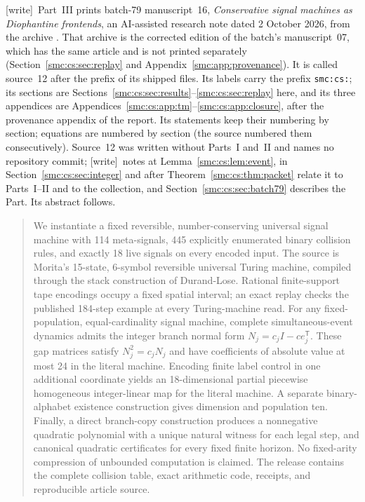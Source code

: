 \documentclass[11pt,letterpaper]{article}
\numberwithin{equation}{section}
\theoremstyle{definition}
\theoremstyle{remark}
\newcommand{\wtag}{\textup{[write]}}
\begin{document}
\noindent\wtag\ Part~III prints batch-79 manuscript~16, \emph{Conservative signal machines as Diophantine frontends}, an AI-assisted research note dated 2 October 2026, from the archive . That archive is the corrected edition of the batch's manuscript~07, which has the same article and is not printed separately (Section~\ref{smc:cs:sec:replay} and Appendix~\ref{smc:app:provenance}). It is called source~12 after the prefix of its shipped files. Its labels carry the prefix \texttt{smc:cs:}; its sections are Sections~\ref{smc:cs:sec:results}--\ref{smc:cs:sec:replay} here, and its three appendices are Appendices~\ref{smc:cs:app:tm}--\ref{smc:cs:app:closure}, after the provenance appendix of the report. Its statements keep their numbering by section; equations are numbered by section (the source numbered them consecutively). Source~12 was written without Parts~I and~II and names no repository commit; \wtag\ notes at Lemma~\ref{smc:cs:lem:event}, in Section~\ref{smc:cs:sec:integer} and after Theorem~\ref{smc:cs:thm:packet} relate it to Parts~I--II and to the collection, and Section~\ref{smc:cs:sec:batch79} describes the Part. Its abstract follows.
\begin{quote}\small
We instantiate a fixed reversible, number-conserving universal signal machine with 114 meta-signals, 445 explicitly enumerated binary collision rules, and exactly 18 live signals on every encoded input. The source is Morita's 15-state, 6-symbol reversible universal Turing machine, compiled through the stack construction of Durand-Lose. Rational finite-support tape encodings occupy a fixed spatial interval; an exact replay checks the published 184-step example at every Turing-machine read. For any fixed-population, equal-cardinality signal machine, complete simultaneous-event dynamics admits the integer branch normal form $N_j=c_j I-c e_j^{\mathsf T}$. These gap matrices satisfy $N_j^2=c_j N_j$ and have coefficients of absolute value at most 24 in the literal machine. Encoding finite label control in one additional coordinate yields an 18-dimensional partial piecewise homogeneous integer-linear map for the literal machine. A separate binary-alphabet existence construction gives dimension and population ten. Finally, a direct branch-copy construction produces a nonnegative quadratic polynomial with a unique natural witness for each legal step, and canonical quadratic certificates for every fixed finite horizon. No fixed-arity compression of unbounded computation is claimed. The release contains the complete collision table, exact arithmetic code, receipts, and reproducible article source.
\end{quote}
\end{document}
